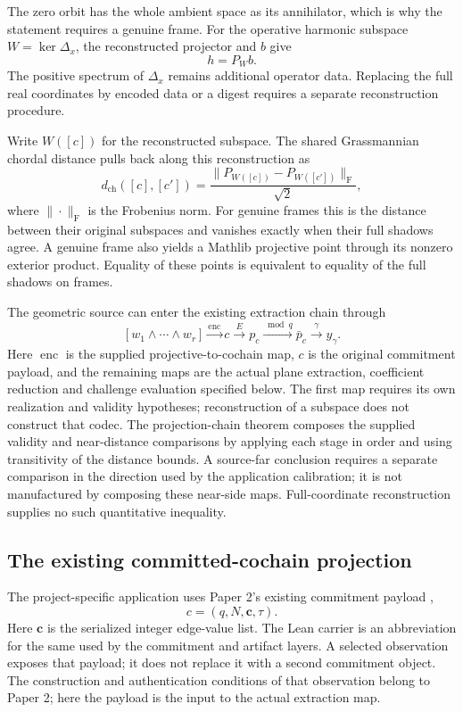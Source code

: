 The zero orbit has the whole ambient space as its annihilator, which is why
the statement requires a genuine frame. For the operative harmonic subspace
\(W=\ker\Delta_x\), the reconstructed projector and \(b\) give
\[
  h=P_Wb.
\]
The positive spectrum of \(\Delta_x\) remains additional operator data.
Replacing the full real coordinates by encoded data or a digest requires a
separate reconstruction procedure.

Write \(W([c])\) for the reconstructed subspace. The shared Grassmannian
chordal distance pulls back along this reconstruction as
\[
  d_{\mathrm{ch}}([c],[c'])
  =\frac{\|P_{W([c])}-P_{W([c'])}\|_{\mathrm F}}{\sqrt{2}},
\]
where \(\|\cdot\|_{\mathrm F}\) is the Frobenius norm. For genuine frames
this is the distance between their original subspaces and vanishes exactly
when their full shadows agree. A genuine frame also yields a Mathlib
projective point through its nonzero exterior product. Equality of these
points is equivalent to equality of the full shadows on frames.

The geometric source can enter the existing extraction chain through
\[
  [w_1\wedge\cdots\wedge w_r]
  \xrightarrow{\operatorname{enc}} c
  \xrightarrow{E} p_c
  \xrightarrow{\bmod q} \bar p_c
  \xrightarrow{\gamma} y_\gamma.
\]
Here \(\operatorname{enc}\) is the supplied projective-to-cochain map,
\(c\) is the original commitment payload, and the remaining maps are the
actual plane extraction, coefficient reduction and challenge evaluation
specified below. The first map requires its own realization and validity
hypotheses; reconstruction of a subspace does not construct that codec.
The projection-chain theorem composes the supplied validity and near-distance
comparisons by applying each stage in order and using transitivity of the
distance bounds. A source-far conclusion requires a separate comparison in
the direction used by the application calibration; it is not manufactured
by composing these near-side maps. Full-coordinate reconstruction supplies
no such quantitative inequality.

\subsection{The existing committed-cochain projection}

The project-specific application uses Paper 2's existing commitment payload
\cite{vanDerVlugt2026protocol},
\[
  c=(q,N,\mathbf c,\tau).
\]
Here \(\mathbf c\) is the serialized integer edge-value list. The Lean
carrier  is an abbreviation for the same
 used by the commitment and artifact
layers. A selected observation exposes that payload; it does not replace it
with a second commitment object. The construction and authentication
conditions of that observation belong to Paper 2; here the payload is the
input to the actual extraction map.

